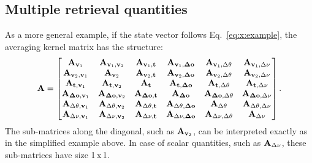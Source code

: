 \subsection*{Multiple retrieval quantities}
%
As a more general example, if the state vector follows Eq.~\ref{eq:x:example},
the averaging kernel matrix has the structure:
\begin{equation}
  \label{eq:A:example}
  \mathbf{A} =
  \begin{bmatrix}
    \mathbf{A}_{\mathbf{v}_1} & \mathbf{A}_{\mathbf{v}_1,\mathbf{v}_2} &
    \mathbf{A}_{\mathbf{v}_1,\mathbf{t}} & \mathbf{A}_{\mathbf{v}_1,\mathbf{\Delta\mathbf{o}}} &
    \mathbf{A}_{\mathbf{v}_1,\Delta\theta} & \mathbf{A}_{\mathbf{v}_1,\Delta\nu} \\ 
    \mathbf{A}_{\mathbf{v}_2,\mathbf{v}_1} & \mathbf{A}_{\mathbf{v}_2} &
    \mathbf{A}_{\mathbf{v}_2,\mathbf{t}} & \mathbf{A}_{\mathbf{v}_2,\mathbf{\Delta\mathbf{o}}} &
    \mathbf{A}_{\mathbf{v}_2,\Delta\theta} & \mathbf{A}_{\mathbf{v}_2,\Delta\nu} \\ 
    \mathbf{A}_{\mathbf{t},\mathbf{v}_1} & \mathbf{A}_{\mathbf{t},\mathbf{v}_2} &
    \mathbf{A}_{\mathbf{t}} & \mathbf{A}_{\mathbf{t},\mathbf{\Delta\mathbf{o}}} &
    \mathbf{A}_{\mathbf{t},\Delta\theta} & \mathbf{A}_{\mathbf{t},\Delta\nu} \\ 
    \mathbf{A}_{\mathbf{\Delta\mathbf{o}},\mathbf{v}_1} & 
    \mathbf{A}_{\mathbf{\Delta\mathbf{o}},\mathbf{v}_2} &
    \mathbf{A}_{\mathbf{\Delta\mathbf{o}},\mathbf{t}} & \mathbf{A}_{\mathbf{\Delta\mathbf{o}}} &
    \mathbf{A}_{\mathbf{\Delta\mathbf{o}},\Delta\theta} &
    \mathbf{A}_{\mathbf{\Delta\mathbf{o}},\Delta\nu} \\ 
    \mathbf{A}_{\Delta\theta,\mathbf{v}_1} & \mathbf{A}_{\Delta\theta,\mathbf{v}_2} &
    \mathbf{A}_{\Delta\theta,\mathbf{t}} & \mathbf{A}_{\Delta\theta,\mathbf{\Delta\mathbf{o}}} &
    \mathbf{A}_{\Delta\theta} & \mathbf{A}_{\Delta\theta,\Delta\nu} \\ 
    \mathbf{A}_{\Delta\nu,\mathbf{v}_1} & \mathbf{A}_{\Delta\nu,\mathbf{v}_2} &
    \mathbf{A}_{\Delta\nu,\mathbf{t}} & \mathbf{A}_{\Delta\nu,\mathbf{\Delta\mathbf{o}}} &
    \mathbf{A}_{\Delta\nu,\Delta\theta} & \mathbf{A}_{\Delta\nu}
  \end{bmatrix}.
\end{equation}
The sub-matrices along the diagonal, such as $\mathbf{A}_{\mathbf{v}_2}$, can
be interpreted exactly as in the simplified example above. In case of scalar
quantities, such as $\mathbf{A}_{\Delta\nu}$, these sub-matrices have size 1\,x\,1.

